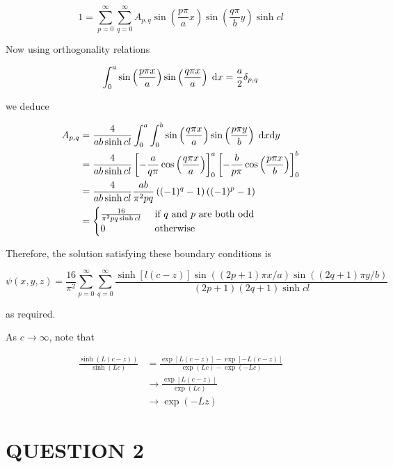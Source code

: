 \documentclass[a4paper]{article}
\begin{document}
\[ 1 
=  \sum_{p = 0}^{\infty} \sum_{q = 0}^{\infty} A_{p,q} \sin \left(  \frac{p \pi}{a} x \right) \sin \left(  \frac{q \pi}{b} y \right)  \sinh cl \]

Now using orthogonality relations

\[ \int_{0}^{a} \sin\left( \frac{p \pi x}{a} \right)\sin\left( \frac{q \pi x}{a} \right) \; \mathrm{d} x = \frac{a}{2} \delta_{p,q}  \]

we deduce

\begin{align*}
A_{p,q} & = \frac{4}{ab \sinh cl} \int_{0}^{a} \int_{0}^{b} \sin\left( \frac{q \pi x}{a} \right)\sin\left( \frac{p \pi y}{b} \right) \; \mathrm{d} x \mathrm{d} y \\
& = \frac{4}{ab \sinh cl} \left[   - \frac{a}{q \pi}  \cos \left(  \frac{q \pi x}{a} \right)  \right]_{0}^{a} \left[   - \frac{b}{p \pi}  \cos \left(  \frac{p \pi x}{b} \right)  \right]_{0}^{b} \\
&  =  \frac{4}{ab \sinh cl} \frac{ab}{\pi^{2} pq}\left(  (-1)^{q} - 1 \right)\left(  (-1)^{p} - 1 \right) \\
& = \begin{cases} \frac{16}{\pi^{2}pq \sinh cl}  & \text{ if } q \text{ and } p \text{ are both odd} \\ 0 & \text{ otherwise } \end{cases}
\end{align*}


Therefore, the solution satisfying these boundary conditions is

\[ \psi(x,y,z) 
=  \frac{16}{\pi^{2}} \sum_{p = 0}^{\infty} \sum_{q = 0}^{\infty} \frac{\sinh \left[  l(c - z)\right] \sin \left( (2p + 1)\pi x / a \right) \sin \left( (2q + 1)\pi y / b \right)   }{ (2p+1)(2q+1)\sinh cl   }   \]

as required.

As $ c  \to \infty $, note that 

\begin{align*}
\frac{\sinh(L(c-z))}{\sinh(Lc)} & = \frac{\exp[ L(c-z)]  - \exp[-L(c-z)]  }{\exp(Lc) - \exp(-Lc)  }\\
& \to \frac{\exp[ L(c-z)]}{\exp(Lc)} \\
& \to \exp(-Lz)
\end{align*}





\section{QUESTION 2}
\end{document}
